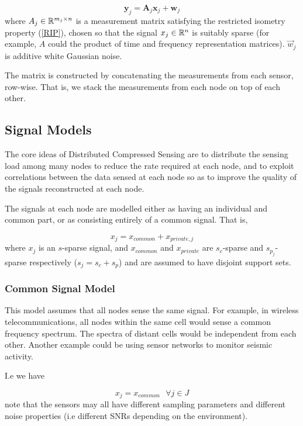 \begin{equation}
\textbf{y}_j = \textbf{A}_j \textbf{x}_j + \textbf{w}_j
\end{equation}
where \(A_j \in {\mathbb{R}}^{m_j \times n}\) is a measurement matrix satisfying the restricted isometry property (\ref{RIP}), chosen so that the signal \(x_j \in {\mathbb{R}}^n\) is suitably sparse (for example, \(A\) could the product of time and frequency representation matrices). \(\vec{w}_j\) is additive white Gaussian noise. 

The matrix is constructed by concatenating the measurements from each sensor, row-wise. That is, we stack the measurements from each node on top of each other.

\subsection{Signal Models}
The core ideas of Distributed Compressed Sensing are to distribute the sensing load among many nodes to reduce the rate required at each node, and to exploit correlations between the data sensed at each node so as to improve the quality of the signals reconstructed at each node. 

The signals at each node are modelled either as having an individual and common part, or as consisting entirely of a common signal. That is,

\begin{equation}
x_j = x_{common} + x_{private,j}
\end{equation}
where \(x_j\) is an \(s\)-sparse signal, and \(x_{common}\) and \(x_{private}\) are \(s_c\)-sparse and \(s_{p_{j}}\)-sparse respectively (\(s_j = s_c + s_p\)) and are assumed to have disjoint support sets.

\subsubsection{Common Signal Model}
This model assumes that all nodes sense the same signal. For example, in wireless telecommunications, all nodes within the same cell would sense a common frequency spectrum. The spectra of distant cells would be independent from each other. Another example could be using sensor networks to monitor seismic activity. 

I.e we have

\begin{equation}
x_j = x_{common} \text{ } \forall j \in J
\end{equation}
note that the sensors may all have different sampling parameters and different noise properties (i.e different SNRs depending on the environment). 

